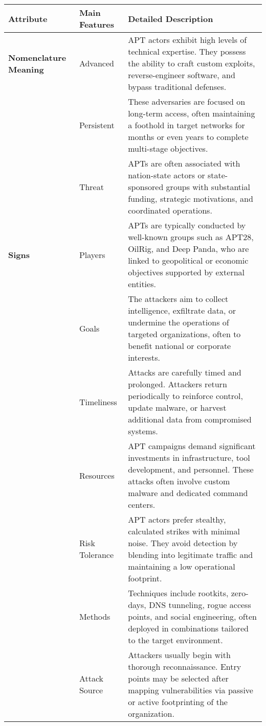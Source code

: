 \begin{table}
\centering

\begin{tabular}{l l l}\toprule
\textbf{Attribute} & \textbf{Main Features} & \textbf{Detailed Description} \\\midrule

\textbf{Nomenclature Meaning} & Advanced & APT actors exhibit high levels of technical expertise. They possess the ability to craft custom exploits, reverse-engineer software, and bypass traditional defenses. \\
 & Persistent & These adversaries are focused on long-term access, often maintaining a foothold in target networks for months or even years to complete multi-stage objectives. \\
 & Threat & APTs are often associated with nation-state actors or state-sponsored groups with substantial funding, strategic motivations, and coordinated operations. \\
\textbf{Signs} & Players & APTs are typically conducted by well-known groups such as APT28, OilRig, and Deep Panda, who are linked to geopolitical or economic objectives supported by external entities. \\
 & Goals & The attackers aim to collect intelligence, exfiltrate data, or undermine the operations of targeted organizations, often to benefit national or corporate interests. \\
 & Timeliness & Attacks are carefully timed and prolonged. Attackers return periodically to reinforce control, update malware, or harvest additional data from compromised systems. \\
 & Resources & APT campaigns demand significant investments in infrastructure, tool development, and personnel. These attacks often involve custom malware and dedicated command centers. \\
 & Risk Tolerance & APT actors prefer stealthy, calculated strikes with minimal noise. They avoid detection by blending into legitimate traffic and maintaining a low operational footprint. \\
 & Methods & Techniques include rootkits, zero-days, DNS tunneling, rogue access points, and social engineering, often deployed in combinations tailored to the target environment. \\
 & Attack Source & Attackers usually begin with thorough reconnaissance. Entry points may be selected after mapping vulnerabilities via passive or active footprinting of the organization. \\

\end{tabular}
\end{table}
